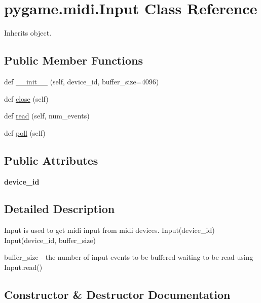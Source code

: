 \hypertarget{classpygame_1_1midi_1_1_input}{}\section{pygame.\+midi.\+Input Class Reference}
\label{classpygame_1_1midi_1_1_input}


Inherits object.

\subsection*{Public Member Functions}
\begin{DoxyCompactItemize}
\item 
def \hyperlink{classpygame_1_1midi_1_1_input_a92be120cd0dc0d71f57204b0614f22e1}{\+\_\+\+\_\+init\+\_\+\+\_\+} (self, device\+\_\+id, buffer\+\_\+size=4096)
\item 
def \hyperlink{classpygame_1_1midi_1_1_input_a304ec0bb72449b749418786ea97e0256}{close} (self)
\item 
def \hyperlink{classpygame_1_1midi_1_1_input_ae815968ae5fcf52f9d86a6f9611bc2fa}{read} (self, num\+\_\+events)
\item 
def \hyperlink{classpygame_1_1midi_1_1_input_a4f4c04b798c914b0b469a78e79350908}{poll} (self)
\end{DoxyCompactItemize}
\subsection*{Public Attributes}
\begin{DoxyCompactItemize}
\item 
\mbox{\label{classpygame_1_1midi_1_1_input_a2a45fbd64dc3eeb2bd8f808e014d3eaa}} 
{\bfseries device\+\_\+id}
\end{DoxyCompactItemize}


\subsection{Detailed Description}
\begin{DoxyVerb}Input is used to get midi input from midi devices.
Input(device_id)
Input(device_id, buffer_size)

buffer_size - the number of input events to be buffered waiting to
  be read using Input.read()
\end{DoxyVerb}
 

\subsection{Constructor \& Destructor Documentation}
\mbox{\label{classpygame_1_1midi_1_1_input_a92be120cd0dc0d71f57204b0614f22e1}} 

